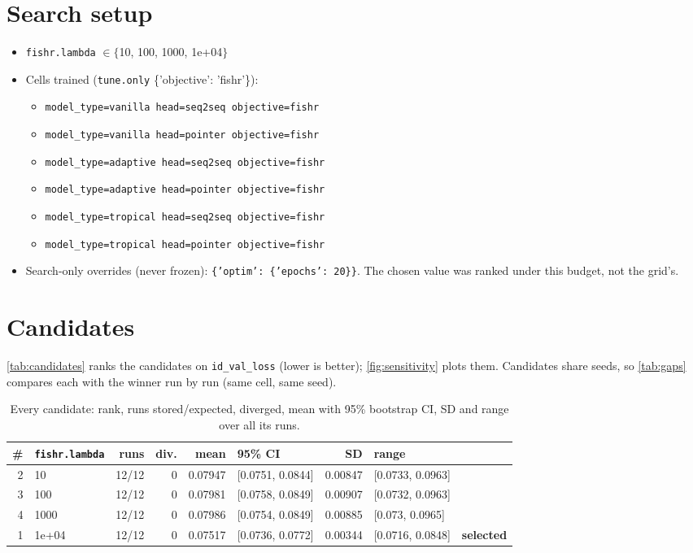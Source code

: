 \documentclass[10pt]{article}
\begin{document}
\section{Search setup}
\begin{itemize}\setlength\itemsep{0pt}
\item \texttt{fishr.lambda} $\in \{$10, 100, 1000, 1e+04$\}$
\item Cells trained (\texttt{tune.only} \{'objective': 'fishr'\}):
\begin{itemize}\setlength\itemsep{0pt}
\item \texttt{model\_type=vanilla head=seq2seq objective=fishr}
\item \texttt{model\_type=vanilla head=pointer objective=fishr}
\item \texttt{model\_type=adaptive head=seq2seq objective=fishr}
\item \texttt{model\_type=adaptive head=pointer objective=fishr}
\item \texttt{model\_type=tropical head=seq2seq objective=fishr}
\item \texttt{model\_type=tropical head=pointer objective=fishr}
\end{itemize}
\item Search-only overrides (never frozen): \texttt{\{'optim': \{'epochs': 20\}\}}. The chosen value was ranked under this budget, not the grid's.
\end{itemize}

\section{Candidates}
\autoref{tab:candidates} ranks the candidates on \texttt{id\_val\_loss} (lower is better); \autoref{fig:sensitivity} plots them.
Candidates share seeds, so \autoref{tab:gaps} compares each with the winner run by run (same cell, same seed).

{\small
\begin{longtable}{rlrrrlrll}
\caption{Every candidate: rank, runs stored/expected, diverged, mean with 95\% bootstrap CI, SD and range over all its runs.}\label{tab:candidates}\\
\toprule
\# & \texttt{fishr.lambda} & runs & div. & mean & 95\% CI & SD & range & \\
\midrule
\endhead
2 & 10 & 12/12 & 0 & 0.07947 & [0.0751, 0.0844] & 0.00847 & [0.0733, 0.0963] & \\
3 & 100 & 12/12 & 0 & 0.07981 & [0.0758, 0.0849] & 0.00907 & [0.0732, 0.0963] & \\
4 & 1000 & 12/12 & 0 & 0.07986 & [0.0754, 0.0849] & 0.00885 & [0.073, 0.0965] & \\
1 & 1e+04 & 12/12 & 0 & 0.07517 & [0.0736, 0.0772] & 0.00344 & [0.0716, 0.0848] & \textbf{selected}\\
\bottomrule
\end{longtable}
}
\end{document}
